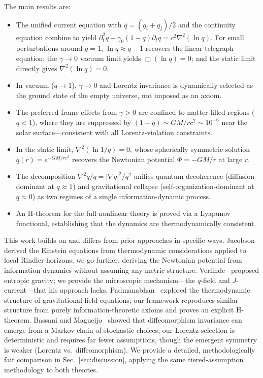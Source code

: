 \documentclass[aps,prd,twocolumn,showpacs,superscriptaddress,preprintnumbers]{revtex4-2}
\begin{document}
The main results are:

\begin{itemize}
    \item The unified current equation with $\bar{q}=(q_i+q_j)/2$ and the continuity equation combine to yield $\partial_t^2 q + \gamma_0(1-q)\partial_t q = c^2\nabla^2(\ln q)$. For small perturbations around $q=1$, $\ln q\approx q-1$ recovers the linear telegraph equation; the $\gamma\to0$ vacuum limit yields $\Box(\ln q)=0$; and the static limit directly gives $\nabla^2(\ln q)=0$.
    \item In vacuum ($q\to1$), $\gamma\to0$ and Lorentz invariance is dynamically selected as the ground state of the empty universe, not imposed as an axiom.
    \item The preferred-frame effects from $\gamma>0$ are confined to matter-filled regions ($q<1$), where they are suppressed by $(1-q)\sim GM/rc^2\sim10^{-6}$ near the solar surface---consistent with all Lorentz-violation constraints.
    \item In the static limit, $\nabla^2(\ln 1/q)=0$, whose spherically symmetric solution $q(r)=e^{-GM/rc^2}$ recovers the Newtonian potential $\Phi=-GM/r$ at large $r$.
    \item The decomposition $\nabla^2 q/q = |\nabla q|^2/q^2$ unifies quantum decoherence (diffusion-dominant at $q\approx1$) and gravitational collapse (self-organization-dominant at $q\approx0$) as two regimes of a single information-dynamic process.
    \item An H-theorem for the full nonlinear theory is proved via a Lyapunov functional, establishing that the dynamics are thermodynamically consistent.
\end{itemize}

This work builds on and differs from prior approaches in specific ways.
Jacobson~\cite{Jacobson:1995ab} derived the Einstein equations from thermodynamic considerations applied to local Rindler horizons; we go further, deriving the Newtonian potential from information dynamics without assuming any metric structure.
Verlinde~\cite{Verlinde:2010hp} proposed entropic gravity; we provide the microscopic mechanism---the $q$-field and $J$-current---that his approach lacks.
Padmanabhan~\cite{Padmanabhan:2010} explored the thermodynamic structure of gravitational field equations; our framework reproduces similar structure from purely information-theoretic axioms and proves an explicit H-theorem.
Bassani and Magueijo~\cite{Bassani:2025htma} showed that diffeomorphism invariance can emerge from a Markov chain of stochastic choices; our Lorentz selection is deterministic and requires far fewer assumptions, though the emergent symmetry is weaker (Lorentz vs.\ diffeomorphism).
We provide a detailed, methodologically fair comparison in Sec.~\ref{sec:discussion}, applying the same tiered-assumption methodology to both theories.
\end{document}
